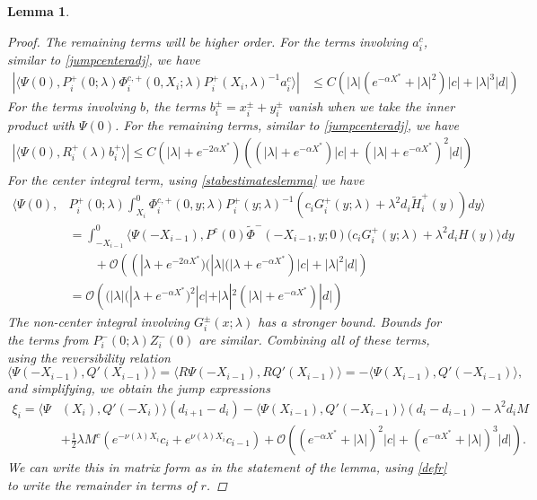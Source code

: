 \documentclass[10pt,reqno]{amsart}
\theoremstyle{plain}
\newtheorem{lemma}[theorem]{Lemma}
\theoremstyle{definition}
\theoremstyle{remark}
\numberwithin{theorem}{section}
\numberwithin{equation}{section}
\begin{document}
\begin{lemma}
\begin{proof}
The remaining terms will be higher order. For the terms involving $a_i^c$, similar to \cref{jumpcenteradj}, we have
\begin{align*}
\left| \langle \Psi(0), P_i^+(0; \lambda) \Phi_i^{c,+}(0, X_i; \lambda) P_i^+(X_i, \lambda)^{-1} a_i^c \rangle \right| &\leq C \left( |\lambda| (e^{-\alpha X^*} + |\lambda|^2) |c| +|\lambda|^3 |d| \right)
\end{align*}
For the terms involving $b$, the terms $b_i^\pm = x_i^\pm + y_i^\pm$ vanish when we take the inner product with $\Psi(0)$. For the remaining terms, similar to \cref{jumpcenteradj}, we have
\begin{align*}
|\langle \Psi(0), R_i^+(\lambda) b_i^+ \rangle |\leq C \left(|\lambda| + e^{-2 \alpha X^*}\right)\left((|\lambda|+e^{-\alpha X^*})|c| + (|\lambda| + e^{-\alpha X^*})^2 |d| \right)
\end{align*}
For the center integral term, using \cref{stabestimateslemma} we have
\begin{align*}
\langle \Psi(0), &P_i^+(0; \lambda) \int_{X_i}^0 \Phi_i^{c,+}(0, y; \lambda) P_i^+(y; \lambda)^{-1}( c_i G_i^+(y; \lambda) + \lambda^2 d_i \tilde{H}_i^+(y)) dy  \rangle \\
&= \int_{-X_{i-1}}^0 \langle \Psi(-X_{i-1}), P^c(0) \tilde{\Phi}^-(-X_{i-1}, y; 0) 
 (c_i G_i^+(y; \lambda) + \lambda^2 d_i H(y) \rangle dy \\
&\qquad +\mathcal{O}\left( (|\lambda + e^{-2\alpha X^*})(|\lambda|(|\lambda + e^{-\alpha X^*})|c| + |\lambda|^2 |d| \right) \\
&= \mathcal{O}\left( (|\lambda|(|\lambda + e^{-\alpha X^*})^2|c| + |\lambda|^2 (|\lambda| + e^{-\alpha X^*}) |d| \right) 
\end{align*}
The non-center integral involving $G_i^\pm(x; \lambda)$ has a stronger bound. Bounds for the terms from $P_i^-(0; \lambda) Z_i^-(0)$ are similar. Combining all of these terms, using the reversibility relation
\[
\langle \Psi(-X_{i-1}), Q'(X_{i-1}) \rangle = \langle R \Psi(-X_{i-1}), R Q'(X_{i-1}) \rangle = 
-\langle \Psi(X_{i-1}), Q'(-X_{i-1}) \rangle,
\]
and simplifying, we obtain the jump expressions
\begin{align*}
\xi_i = \langle \Psi&(X_i), Q'(-X_i) \rangle (d_{i+1} - d_i ) - \langle \Psi(X_{i-1}), Q'(-X_{i-1}) \rangle (d_i - d_{i-1} ) - \lambda^2 d_i M  \\
&+ \frac{1}{2}\lambda M^c \left( e^{-\nu(\lambda)X_i}c_i + e^{\nu(\lambda)X_i}c_{i-1}\right)
+ \mathcal{O}\left( (e^{-\alpha X^*} + |\lambda|)^2 |c| + (e^{-\alpha X^*} + |\lambda|)^3 |d| \right).
\end{align*}
We can write this in matrix form as in the statement of the lemma, using \cref{defr} to write the remainder in terms of $r$.
\end{proof}
\end{lemma}
\end{document}
